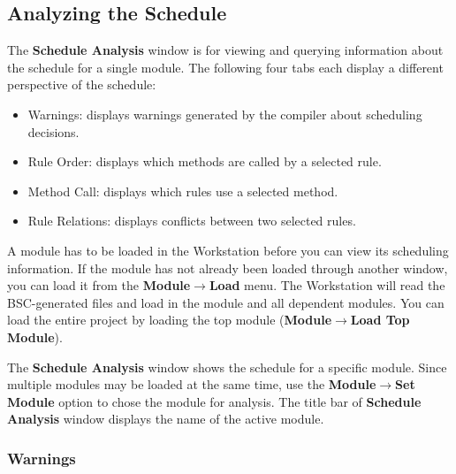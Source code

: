 \documentclass{article}
\begin{document}
\subsection{Analyzing the Schedule}

The {\bf Schedule Analysis} window is for viewing and querying
information about the schedule for a single module. The following four
tabs   each display a different perspective of the schedule:
\begin{itemize}
\item Warnings: displays warnings generated by the compiler about scheduling decisions.
\item Rule Order: displays which methods are called by a selected rule.
\item Method Call: displays which rules use a selected method.
\item Rule Relations: displays conflicts between two selected rules.
\end{itemize}

 A module has to be loaded in the Workstation before you can view its scheduling
information.  If the
module has  not already  been loaded through another window, you can
load it from the {\bf Module$\rightarrow$Load} menu.  The Workstation
will read the BSC-generated files and load in the module and all
dependent modules.   You can load the entire project by loading the
top module ({\bf Module$\rightarrow$Load Top Module}).

The {\bf Schedule Analysis} window shows the schedule for a specific
module.  Since multiple modules may be loaded at the same time, use
the {\bf Module$\rightarrow$Set Module} option to chose the module for
analysis. The title bar of {\bf Schedule Analysis} window displays the
name of the active module.



\subsubsection{Warnings}
\end{document}
